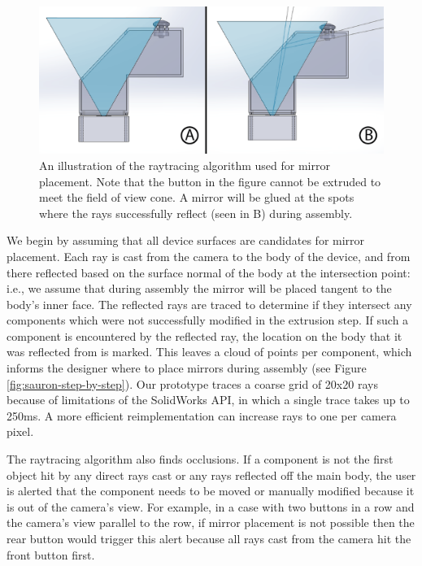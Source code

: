 \begin{figure}
\centering
\includegraphics[width=\textwidth]{figures/sauron/reflection.png}
\caption{An illustration of the raytracing algorithm used for mirror placement. Note that the button in the figure cannot be extruded to meet the field of view cone. A mirror will be glued at the spots where the rays successfully reflect (seen in B) during assembly.}
\label{fig:sauron-raytracing}
\end{figure}

We begin by assuming that all device surfaces are candidates for mirror placement. Each ray is cast from the camera to the body of the device, and from there reflected  based on the surface normal of the body at the intersection point: i.e., we assume that during assembly the mirror will be placed tangent to the body's inner face. The reflected rays are traced to determine if they intersect any components which were not successfully modified in the extrusion step. If such a component is encountered by the reflected ray, the location on the body that it was reflected from is marked. This leaves a cloud of points per component, which informs the designer where to place mirrors during assembly (see Figure \ref{fig:sauron-step-by-step}). Our prototype traces a coarse grid of 
20x20 rays because of limitations of the SolidWorks API, in which a single trace takes up to 250ms. A more efficient reimplementation can increase rays to one per camera pixel.

The raytracing algorithm also finds occlusions. If a component %
is not the first object hit by any direct rays cast or any rays reflected off the main body, the user is alerted that the component needs to be moved or manually modified because it is out of the camera's view. For example, in a case with two buttons in a row and the camera's view parallel to the row, if mirror placement is not possible then the rear button would trigger this alert because all rays cast from the camera hit the front button first.

